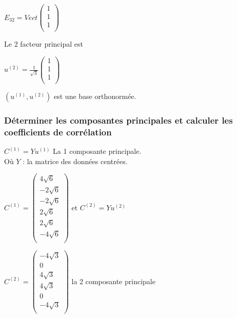 \documentclass[a4paper, 12pt]{article}
\begin{document}
\begin{center}
$
E_{32} = Vect
\begin{pmatrix}
1 \\
1 \\
1 \\
\end{pmatrix}
$
\end{center}

\begin{flushleft}
Le 2 facteur principal est
\end{flushleft}

\begin{center}
$
u^{(2)} = \frac{1}{\sqrt{3}}
\begin{pmatrix}
1 \\
1 \\
1 \\
\end{pmatrix}
$
\end{center}

\begin{flushleft}
$(u^{(1)}, u^{(2)})$ est une base orthonormée.
\end{flushleft}


\subsubsection{Déterminer les composantes principales et calculer les coefficients de corrélation}
\begin{flushleft}
$C^{(1)} = Yu^{(1)}$ La 1 composante principale. \\
Où $Y$ : la matrice des données centrées.
\end{flushleft}

\begin{flushleft}
$
C^{(1)} =
\begin{pmatrix}
4\sqrt{6} \\
-2\sqrt{6} \\
-2\sqrt{6} \\
2\sqrt{6} \\
2\sqrt{6} \\
-4\sqrt{6} \\
\end{pmatrix}
\text{ et } C^{(2)} = Yu^{(2)}
$
\end{flushleft}

\begin{flushleft}
$
C^{(2)} =
\begin{pmatrix}
-4\sqrt{3} \\
0 \\
4\sqrt{3} \\
4\sqrt{3} \\
0 \\
-4\sqrt{3} \\
\end{pmatrix}
$
la 2 composante principale
\end{flushleft}
\end{document}
